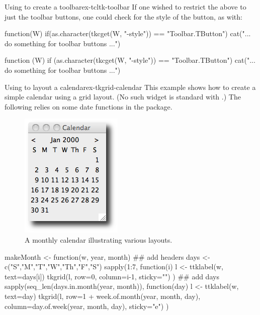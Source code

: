 \begin{example}{Using  to create a toolbar}{ex-tcltk-toolbar}
If one wished to restrict the above to just the toolbar buttons, one
could check for the style of the button, as with:

\begin{Schunk}
\begin{Sinput}
 function(W) {
   if(as.character(tkcget(W, "-style")) == "Toolbar.TButton")
     cat("... do something for toolbar buttons ...")
 }
\end{Sinput}
\begin{Soutput}
function (W) 
{
    if (as.character(tkcget(W, "-style")) == "Toolbar.TButton") 
        cat("... do something for toolbar buttons ...")
}
\end{Soutput}
\end{Schunk}
\end{example}

\begin{example}{Using  to layout a calendar}{ex-tkgrid-calendar}
This example shows how to create a simple calendar using a grid
layout. (No such widget is standard with .) The following
relies on some date functions in the  package.




\begin{figure}
  \centering
  \includegraphics[width=.4\textwidth]{fig-tcltk-grid-calendar}
  \caption{A monthly calendar illustrating various layouts.}
  \label{fig:qt-gridlayout-calendar}
\end{figure}


\begin{Schunk}
\begin{Sinput}
 makeMonth <- function(w, year, month) {
   ## add headers
   days <- c("S","M","T","W","Th","F","S")
   sapply(1:7, function(i) {
     l <- ttklabel(w, text=days[i])       
     tkgrid(l, row=0, column=i-1, sticky="")
   })
   ## add days
   sapply(seq_len(days.in.month(year, month)),  function(day) {
     l <- ttklabel(w, text=day)
     tkgrid(l, row=1 + week.of.month(year, month, day),
            column=day.of.week(year, month, day),
            sticky="e")
   })
 }
\end{Sinput}
\end{Schunk}


\end{example}
